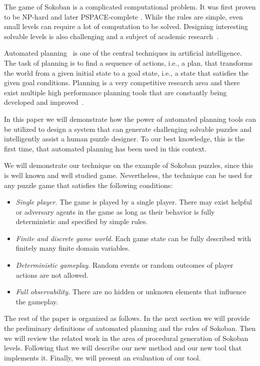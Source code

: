 \documentclass[runningheads]{llncs}
\begin{document}
The game of Sokoban is a complicated computational problem. It was first proven
to be NP-hard \cite{dorit96} and later PSPACE-complete \cite{culberson97}. While
the rules are simple, even small levels can require a lot of computation to be
solved. Designing interesting solvable levels is also challenging and a subject
of academic research~\cite{murase1996automatic,taylor2011procedural,kartal2016data,de2019procedural}.

Automated planning~\cite{ghallab2016automated} is one of the central techniques in artificial intelligence.
The task of planning is to find a sequence of actions, i.e., a plan, that transforms the world
from a given initial state to a goal state, i.e., a state that satisfies the given goal conditions.
Planning is a very competitive research area and there exist multiple high performance planning
tools that are constantly being developed and improved~\cite{ipc}.

In this paper we will demonstrate how the power of automated planning tools can be utilized
to design a system that can generate challenging solvable puzzles and intelligently assist
a human puzzle designer. To our best knowledge, this is the first time, that automated planning has
been used in this context.

We will demonstrate our technique on the example of Sokoban puzzles, since this is well known
and well studied game. Nevertheless, the technique can be used for any puzzle game that satisfies
the following conditions:
\begin{itemize}
\item \emph{Single player.} The game is played by a single player. There may exist helpful or adversary agents
in the game as long as their behavior is fully deterministic and specified by simple rules.
\item \emph{Finite and discrete game world.} Each game state can be fully described with finitely many
 finite domain variables.
\item \emph{Deterministic gameplay.} Random events or random outcomes of player actions are not allowed.
\item \emph{Full observability.} There are no hidden or unknown elements that influence the gameplay.
\end{itemize}

The rest of the paper is organized as follows. In the next section we will provide the preliminary definitions
of automated planning and the rules of Sokoban. Then we will review the related work in the
area of procedural generation of Sokoban levels. Following that we will describe our new
method and our new tool that implements it. Finally, we will present an evaluation of our tool.
\end{document}

